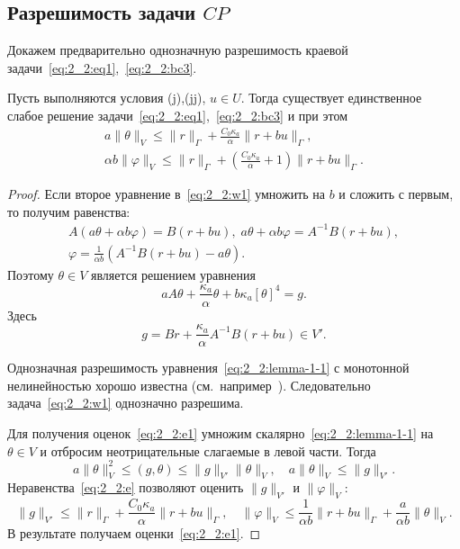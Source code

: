 \subsection{Разрешимость задачи $CP$}\label{subsec:ch2/sec2/subsec3}


Докажем предварительно однозначную разрешимость краевой задачи~\eqref{eq:2_2:eq1},~\eqref{eq:2_2:bc3}.

\begin{lemma}
    \label{lm:2_2:1}
    Пусть выполняются условия (j),(jj), $u\in U$.
    Тогда существует единственное слабое решение
    задачи~\eqref{eq:2_2:eq1},~\eqref{eq:2_2:bc3} и при этом
    \begin{equation}
        \label{eq:2_2:e1}
        \begin{aligned}
            a\|\theta\|_V \leq \|r\|_\Gamma + \frac{C_0\kappa_a}{\alpha}\|r+bu\|_\Gamma, \\
            \alpha b \|\varphi\|_V \leq \|r\|_\Gamma +
            \left(\frac{C_0\kappa_a}{\alpha} + 1\right)\|r+bu\|_\Gamma.
        \end{aligned}
    \end{equation}
\end{lemma}

\begin{proof}
    Если второе уравнение в~\eqref{eq:2_2:w1} умножить на $b$ и сложить с первым, то получим равенства:
    \begin{gather*}
        A \left( a \theta + \alpha b \varphi \right) = B(r + bu),\;
        a\theta + \alpha b \varphi = A^{-1}B(r + bu),\\
        \varphi = \frac{1}{\alpha b}(A^{-1}B(r +bu) - a\theta).
    \end{gather*}
    Поэтому $\theta \in V$ является решением уравнения
    \begin{equation}
        \label{eq:2_2:lemma-1-1}
        a A \theta + \frac{\kappa_a}{\alpha} \theta + b\kappa_a [\theta]^4 = g.
    \end{equation}
    Здесь
    \[
        g = Br + \frac{\kappa_a}{\alpha}A^{-1}B(r+bu) \in V'.
    \]


    Однозначная разрешимость уравнения~\eqref{eq:2_2:lemma-1-1} с монотонной нелинейностью
    хорошо известна (см.\ например~\cite{Kufner}).
    Следовательно задача~\eqref{eq:2_2:w1} однозначно разрешима.

    Для получения оценок~\eqref{eq:2_2:e1} умножим скалярно~\eqref{eq:2_2:lemma-1-1}
    на $\theta \in V$ и отбросим неотрицательные
    слагаемые в левой части.
    Тогда
    \[
        a \|\theta\|^2_V \leq (g, \theta) \leq \|g\|_{V'}\|\theta\|_V,
        \quad a\|\theta\|_V \leq \|g\|_{V'}.
    \]
    Неравенства~\eqref{eq:2_2:e} позволяют оценить $\|g\|_{V'}$ и $\|\varphi\|_V $:
    \[
        \|g\|_{V'} \leq \|r\|_\Gamma + \frac{C_0\kappa_a}{\alpha}\|r + bu\|_\Gamma, \quad
        \|\varphi\|_V \leq \frac{1}{\alpha b} \|r + bu\|_\Gamma + \frac{a}{\alpha b} \|\theta\|_V.
    \]
    В результате получаем оценки~\eqref{eq:2_2:e1}.
\end{proof}

